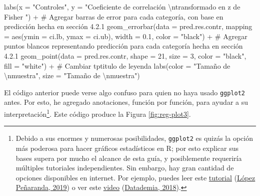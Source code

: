 \documentclass[
  bookmarksnumbered]{article}
\newenvironment{Shaded}{\begin{snugshade}}{\end{snugshade}}
\newcommand{\AttributeTok}[1]{\textcolor[rgb]{0.00,0.34,0.68}{#1}}
\newcommand{\CommentTok}[1]{\textcolor[rgb]{0.54,0.53,0.53}{#1}}
\newcommand{\DecValTok}[1]{\textcolor[rgb]{0.69,0.50,0.00}{#1}}
\newcommand{\FloatTok}[1]{\textcolor[rgb]{0.69,0.50,0.00}{#1}}
\newcommand{\FunctionTok}[1]{\textcolor[rgb]{0.39,0.29,0.61}{#1}}
\newcommand{\NormalTok}[1]{\textcolor[rgb]{0.12,0.11,0.11}{#1}}
\newcommand{\SpecialCharTok}[1]{\textcolor[rgb]{0.24,0.68,0.91}{#1}}
\newcommand{\StringTok}[1]{\textcolor[rgb]{0.75,0.01,0.01}{#1}}
\begin{document}
\begin{Shaded}
\begin{Highlighting}[]
  \FunctionTok{labs}\NormalTok{(}\AttributeTok{x =} \StringTok{"Controles"}\NormalTok{, }
       \AttributeTok{y =} \StringTok{"Coeficiente de correlación }\SpecialCharTok{\textbackslash{}n}\StringTok{transformado en z de Fisher "}\NormalTok{) }\SpecialCharTok{+}
  \CommentTok{\# Agregar barras de error para cada categoría, con base en predicción hecha en sección 4.2.1}
  \FunctionTok{geom\_errorbar}\NormalTok{(}\AttributeTok{data =}\NormalTok{ pred.res.contr,}
                \AttributeTok{mapping =} \FunctionTok{aes}\NormalTok{(}\AttributeTok{ymin =}\NormalTok{ ci.lb, }\AttributeTok{ymax =}\NormalTok{ ci.ub),}
                \AttributeTok{width =} \FloatTok{0.1}\NormalTok{,}
                \AttributeTok{color =} \StringTok{"black"}\NormalTok{) }\SpecialCharTok{+}
  \CommentTok{\# Agregar puntos blancos representando predicción para cada categoría hecha en sección 4.2.1}
  \FunctionTok{geom\_point}\NormalTok{(}\AttributeTok{data =}\NormalTok{ pred.res.contr,}
             \AttributeTok{shape =} \DecValTok{21}\NormalTok{, }\AttributeTok{size =} \DecValTok{3}\NormalTok{,}
             \AttributeTok{color =} \StringTok{"black"}\NormalTok{, }\AttributeTok{fill =} \StringTok{"white"}\NormalTok{) }\SpecialCharTok{+}
  \CommentTok{\# Cambiar tptitulo de leyenda}
  \FunctionTok{labs}\NormalTok{(}\AttributeTok{color =} \StringTok{"Tamaño de }\SpecialCharTok{\textbackslash{}n}\StringTok{muestra"}\NormalTok{,}
       \AttributeTok{size =} \StringTok{"Tamaño de }\SpecialCharTok{\textbackslash{}n}\StringTok{muestra"}\NormalTok{)}
\end{Highlighting}
\end{Shaded}

El código anterior puede verse algo confuso para quien no haya usado \texttt{ggplot2} antes. Por esto, he agregado anotaciones, función por función, para ayudar a su interpretación\footnote{Debido a sus enormes y numerosas posibilidades, \texttt{ggplot2} es quizás la opción más poderosa para hacer gráficos estadísticos en R; por esto explicar sus bases supera por mucho el alcance de esta guía, y posiblemente requeriría múltiples tutoriales independientes. Sin embargo, hay gran cantidad de opciones disponibles en internet. Por ejemplo, puedes leer este \href{https://rpubs.com/anlope10/562981}{tutorial} (\protect\hyperlink{ref-lopezpenarandaTutorialGgplot22019}{López Peñaranda, 2019}) o ver este \href{https://youtu.be/BUzTAr_QqKs}{video} (\protect\hyperlink{ref-datademiaAprendeGgplot22018}{Datademia, 2018}).}. Este código produce la Figura \ref{fig:reg-plot3}.
\end{document}
